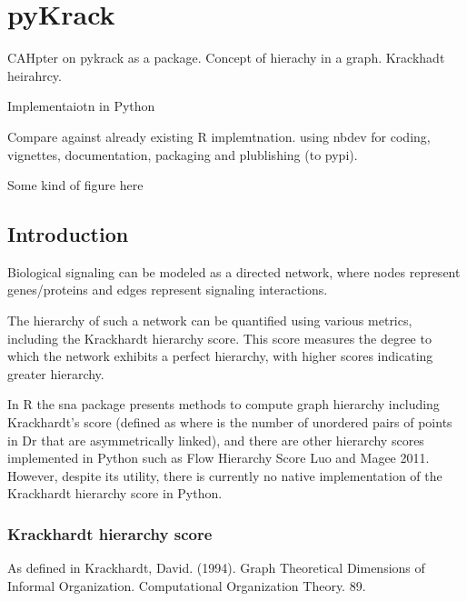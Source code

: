 {}

\appendix

\chapter{pyKrack}
\label{appendix:pykrack}

CAHpter on pykrack as a package. Concept of hierachy in a graph. Krackhadt heirahrcy. 

Implementaiotn in Python

Compare against already existing R implemtnation.
using nbdev for coding, vignettes, documentation, packaging and plublishing (to pypi).

Some kind of figure here

\section{Introduction}

Biological signaling can be modeled as a directed network, where nodes represent genes/proteins and edges represent signaling interactions.

The hierarchy of such a network can be quantified using various metrics, including the Krackhardt hierarchy score. This score measures the degree to which the network exhibits a perfect hierarchy, with higher scores indicating greater hierarchy.

In R the sna package presents methods to compute graph hierarchy including Krackhardt’s score (defined as
where is the number of unordered pairs of points in Dr that are asymmetrically linked), and there are other hierarchy scores implemented in Python such as Flow Hierarchy Score Luo and Magee 2011. However, despite its utility, there is currently no native implementation of the Krackhardt hierarchy score in Python.

\subsection{Krackhardt hierarchy score}

As defined in Krackhardt, David. (1994). Graph Theoretical Dimensions of Informal Organization. Computational Organization Theory. 89.

